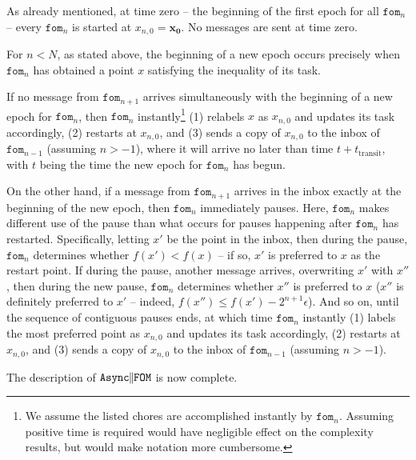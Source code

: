 \documentclass[reqno, 11pt]{amsart}
\numberwithin{equation}{section}
\newcommand{\nt}{\negthinspace}
\newcommand{\fom}{\mathtt{fom}}
\newcommand{\parfom}{\parallel \nt \nt  \mathtt{FOM}}
\newcommand{\ttransit}{t_{\mathrm{transit}}}
\newcommand{\aparfom}{\mathtt{Async} \nt \nt \parfom}
\begin{document}
As already mentioned, at time zero -- the beginning of the first epoch for all $ \fom_n $ -- every $ \fom_n $ is started at $ x_{n,0} = \mathbf{x_0} $.  No messages are sent at time zero.   

For $ n < N $, as stated above, the beginning of a new epoch occurs precisely when $ \fom_n $ has obtained a point $ x $ satisfying the inequality of its task.

If no message from $ \fom_{n+1} $ arrives simultaneously with the beginning of a new epoch for $ \fom_n $, then $ \fom_n $ instantly\footnote{We assume the listed chores are accomplished instantly by $ \fom_n $. Assuming positive time is required would have negligible effect on the complexity results, but would make notation more cumbersome.}    (1) relabels $ x $ as $ x_{n,0} $ and updates its task accordingly, (2) restarts at $ x_{n,0} $, and (3) sends a copy of $ x_{n,0}  $ to the inbox of $ \fom_{n-1} $ (assuming $ n > - 1 $), where it will arrive no later than time $ t + \ttransit $, with $ t $ being the time the new epoch for $ \fom_n $ has begun.

On the other hand, if a message from $ \fom_{n+1} $ arrives in the inbox exactly at the beginning of the new epoch, then $ \fom_n $ immediately pauses. Here, $ \fom_n $ makes different use of the pause than what occurs for pauses happening after $ \fom_n $ has restarted. Specifically, letting $ x' $ be the point in the inbox, then during the pause, $ \fom_n $ determines whether $ f(x') < f(x) $ -- if so, $ x' $ is preferred to $ x $ as the restart point. If during the pause, another message arrives, overwriting $ x' $ with $ x'' $, then during the new pause, $ \fom_n $ determines whether $ x'' $ is preferred to $ x  $ ($ x'' $ is definitely preferred to $ x' $ -- indeed, $ f(x'') \leq  f(x') - 2^{n+1} \epsilon $). And so on, until the sequence of contiguous pauses ends, at which time $ \fom_n $ instantly (1) labels the most preferred point as $ x_{n,0} $ and updates its task accordingly, (2) restarts at $ x_{n,0} $, and (3) sends a copy of $ x_{n,0} $ to the inbox of $ \fom_{n-1} $ (assuming $ n > - 1 $). 

The description of $ \aparfom $ is now complete.
\end{document}
